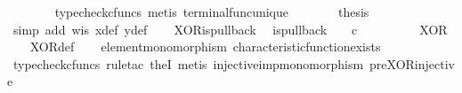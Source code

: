 \begin{isabellebody}
\ \ \ \ \ \ \isamarkupfalse%
\ {\isacharparenleft}{\kern0pt}typecheck{\isacharunderscore}{\kern0pt}cfuncs{\isacharcomma}{\kern0pt}\ metis\ terminal{\isacharunderscore}{\kern0pt}func{\isacharunderscore}{\kern0pt}unique{\isacharparenright}{\kern0pt}\isanewline
\ \ \ \ \isamarkupfalse%
\ \isamarkupfalse%
\ {\isacharquery}{\kern0pt}thesis\isanewline
\ \ \ \ \ \ \isamarkupfalse%
\ {\isacharparenleft}{\kern0pt}simp\ add{\isacharcolon}{\kern0pt}\ w{\isacharunderscore}{\kern0pt}is\ x{\isacharunderscore}{\kern0pt}def\ y{\isacharunderscore}{\kern0pt}def{\isacharparenright}{\kern0pt}\isanewline
\ \ \isamarkupfalse%
\isanewline
{}\isamarkupfalse%
%
\endisatagproof
{\isafoldproof}%
%
\isadelimproof
\isanewline
%
\endisadelimproof
\isanewline
{}\isamarkupfalse%
\ XOR{\isacharunderscore}{\kern0pt}is{\isacharunderscore}{\kern0pt}pullback{\isacharcolon}{\kern0pt}\isanewline
\ \ {\isachardoublequoteopen}is{\isacharunderscore}{\kern0pt}pullback\ {\isacharparenleft}{\kern0pt}{\isasymone}{\isasymCoprod}{\isasymone}{\isacharparenright}{\kern0pt}\ {\isasymone}\ {\isacharparenleft}{\kern0pt}{\isasymOmega}\ {\isasymtimes}\isactrlsub c\ {\isasymOmega}{\isacharparenright}{\kern0pt}\ {\isasymOmega}\ {\isacharparenleft}{\kern0pt}{\isasymbeta}\isactrlbsub {\isacharparenleft}{\kern0pt}{\isasymone}{\isasymCoprod}{\isasymone}{\isacharparenright}{\kern0pt}\isactrlesub {\isacharparenright}{\kern0pt}\ {\isasymt}\ {\isacharparenleft}{\kern0pt}{\isasymlangle}{\isasymt}{\isacharcomma}{\kern0pt}\ {\isasymf}{\isasymrangle}\ {\isasymamalg}\ {\isasymlangle}{\isasymf}{\isacharcomma}{\kern0pt}\ {\isasymt}{\isasymrangle}{\isacharparenright}{\kern0pt}\ XOR{\isachardoublequoteclose}\isanewline
%
\isadelimproof
\ \ %
\endisadelimproof
%
\isatagproof
{}\isamarkupfalse%
\ XOR{\isacharunderscore}{\kern0pt}def\isanewline
\ \ \isamarkupfalse%
\ element{\isacharunderscore}{\kern0pt}monomorphism\ characteristic{\isacharunderscore}{\kern0pt}function{\isacharunderscore}{\kern0pt}exists\isanewline
\ \ \isamarkupfalse%
\ {\isacharparenleft}{\kern0pt}typecheck{\isacharunderscore}{\kern0pt}cfuncs{\isacharcomma}{\kern0pt}\ rule{\isacharunderscore}{\kern0pt}tac\ the{}I{}{\isacharcomma}{\kern0pt}\ metis\ injective{\isacharunderscore}{\kern0pt}imp{\isacharunderscore}{\kern0pt}monomorphism\ pre{\isacharunderscore}{\kern0pt}XOR{\isacharunderscore}{\kern0pt}injective{\isacharparenright}{\kern0pt}%
\endisatagproof
{\isafoldproof}%
%
\isadelimproof

\end{isabellebody}
